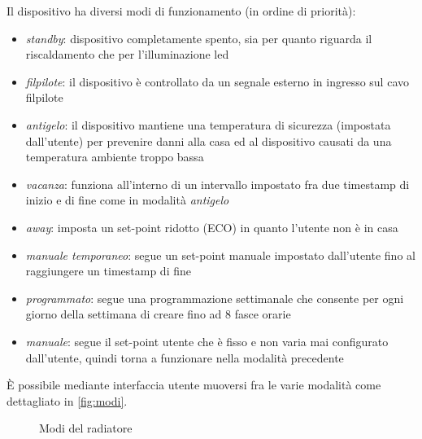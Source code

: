 \documentclass[12pt,a4paper,twoside,titlepage]{book}
\begin{document}
Il dispositivo ha diversi modi di funzionamento (in ordine di priorità):
\begin{itemize}
    \item \textit{standby}: dispositivo completamente spento, sia per quanto riguarda il riscaldamento
    che per l'illuminazione \acrshort{led}
    \item \textit{\gls{filpilote}}: il dispositivo è controllato da un segnale
        esterno in ingresso sul cavo \Gls{filpilote}
    \item \textit{antigelo}: il dispositivo mantiene una temperatura di sicurezza (impostata dall'utente)
        per prevenire danni alla casa ed al dispositivo causati da una temperatura ambiente troppo bassa
    \item \textit{vacanza}: funziona all'interno di un intervallo impostato fra due timestamp di inizio e di 
        fine come in modalità \textit{antigelo}
    \item \textit{away}: imposta un set-point ridotto (ECO) in quanto l'utente non è in casa
    \item \textit{manuale temporaneo}: segue un set-point manuale impostato dall'utente fino al raggiungere 
        un timestamp di fine
    \item \textit{programmato}: segue una programmazione settimanale che consente per ogni
        giorno della settimana di creare fino ad 8 fasce orarie
    \item \textit{manuale}: segue il set-point utente che è fisso e non varia mai
        configurato dall'utente, quindi torna a funzionare nella modalità precedente
\end{itemize}

È possibile mediante interfaccia utente muoversi fra le varie modalità come dettagliato
in \autoref{fig:modi}.

\begin{figure}[ht]
    \centering
    \caption{Modi del radiatore}
    \label{fig:modi}
\end{figure}
\end{document}
